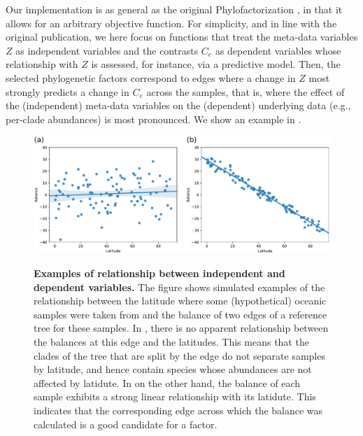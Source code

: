Our implementation is as general as the original Phylofactorization \cite{Washburne2017a},
in that it allows for an arbitrary objective function.
For simplicity, and in line with the original publication,
we here focus on functions that treat the meta-data variables $Z$ as independent variables
and the contrasts $C_e$ as dependent variables whose relationship with $Z$ is assessed, for instance, via a predictive model.
Then, the selected phylogenetic factors correspond to edges
where a change in $Z$ most strongly predicts a change in $C_e$ across the samples,
that is, where the effect of the (independent) meta-data variables
on the (dependent) underlying data (e.g., per-clade abundances) is most pronounced.
We show an example in .

\begin{figure}[!htbp]
    \centering
    \includegraphics[width=\linewidth]{pdf/balance_factors.pdf}
    \begin{subfigure}{0pt}
        \label{fig:balance_factors:sub:bad}
    \end{subfigure}
    \begin{subfigure}{0pt}
        \label{fig:balance_factors:sub:good}
    \end{subfigure}
    \caption[Examples of relationship between independent and dependent variables]{
        \textbf{Examples of relationship between independent and dependent variables.}
        The figure shows simulated examples of the relationship between the latitude
        where some (hypothetical) oceanic samples were taken from
        and the balance of two edges of a reference tree for these samples.
        In , there is no apparent relationship
        between the balances at this edge and the latitudes.
        This means that the clades of the tree that are split by the edge do not separate samples by latitude,
        and hence contain species whose abundances are not affected by latidute.
        In  on the other hand, the balance of each sample
        exhibits a strong linear relationship with its latidute.
        This indicates that the corresponding edge across which the balance was calculated
        is a good candidate for a factor.
    }
    \label{fig:balance_factors}
\end{figure}

